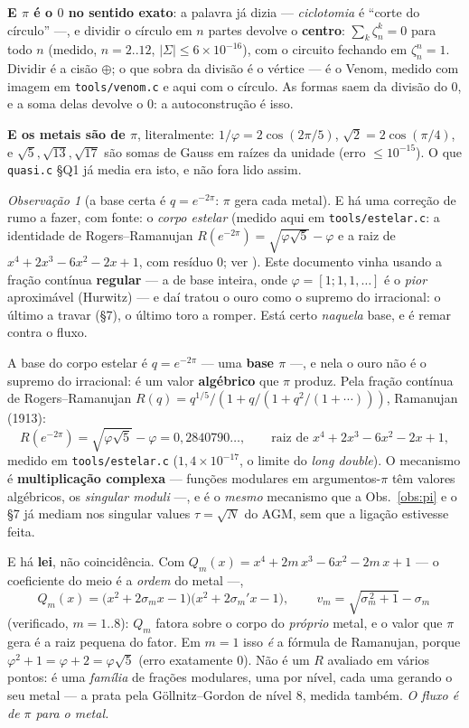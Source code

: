 \documentclass[11pt]{article}
\newcommand{\code}[1]{\texttt{\small #1}}
\theoremstyle{plain}
\theoremstyle{remark}
\newtheorem{obs}{Observação}
\begin{document}
\textbf{E $\pi$ é o $0$ no sentido exato}: a palavra já dizia --- \emph{ciclotomia} é ``corte do
círculo'' ---, e dividir o círculo em $n$ partes devolve o \textbf{centro}: $\sum_k \zeta_n^k = 0$ para
todo $n$ (medido, $n=2..12$, $|\Sigma|\le6\times10^{-16}$), com o circuito fechando em $\zeta_n^n=1$.
Dividir é a cisão $\oplus$; o que sobra da divisão é o vértice --- é o Venom, medido com imagem em
\code{tools/venom.c} e aqui com o círculo. As formas saem da divisão do $0$, e a soma delas devolve o
$0$: a autoconstrução é isso.

\textbf{E os metais são de $\pi$}, literalmente: $1/\varphi=2\cos(2\pi/5)$, $\sqrt2=2\cos(\pi/4)$, e
$\sqrt5,\sqrt{13},\sqrt{17}$ são somas de Gauss em raízes da unidade (erro $\le10^{-15}$). O que
\code{quasi.c} §Q1 já media era isto, e não fora lido assim.

\begin{obs}[a base certa é $q=e^{-2\pi}$: $\pi$ gera cada metal]\label{obs:base}
E há uma correção de rumo a fazer, com fonte: o \emph{corpo estelar}
(medido aqui em \code{tools/estelar.c}: a identidade de Rogers--Ramanujan
$R(e^{-2\pi})=\sqrt{\varphi\sqrt5}-\varphi$ e a raiz de $x^4+2x^3-6x^2-2x+1$, com resíduo $0$;
ver \cite{rogers,ramanujan}). Este documento vinha
usando a fração contínua \textbf{regular} --- a de base inteira, onde $\varphi=[1;1,1,\dots]$ é o
\emph{pior} aproximável (Hurwitz) --- e daí tratou o ouro como o supremo do irracional: o último a
travar (§7), o último toro a romper. Está certo \emph{naquela} base, e é remar contra o fluxo.

A base do corpo estelar é $q=e^{-2\pi}$ --- uma \textbf{base $\pi$} ---, e nela o ouro não é o supremo
do irracional: é um valor \textbf{algébrico} que $\pi$ produz. Pela fração contínua de
Rogers--Ramanujan $R(q)=q^{1/5}/(1+q/(1+q^2/(1+\cdots)))$, Ramanujan (1913):
\[
 R\!\left(e^{-2\pi}\right)=\sqrt{\varphi\sqrt5}-\varphi=0{,}2840790\ldots,
 \qquad\text{raiz de } x^4+2x^3-6x^2-2x+1,
\]
medido em \code{tools/estelar.c} ($1{,}4\times10^{-17}$, o limite do \emph{long double}). O mecanismo é
\textbf{multiplicação complexa} --- funções modulares em argumentos-$\pi$ têm valores algébricos, os
\emph{singular moduli} ---, e é o \emph{mesmo} mecanismo que a Obs.~\ref{obs:pi} e o §7 já mediam nos
singular values $\tau=\sqrt N$ do AGM, sem que a ligação estivesse feita.

E há \textbf{lei}, não coincidência. Com $Q_m(x)=x^4+2m\,x^3-6x^2-2m\,x+1$ --- o coeficiente do meio é
a \emph{ordem} do metal ---,
\[
 Q_m(x)=\bigl(x^2+2\sigma_m x-1\bigr)\bigl(x^2+2\sigma_m' x-1\bigr),
 \qquad \boxed{\,v_m=\sqrt{\sigma_m^{\,2}+1}-\sigma_m\,}
\]
(verificado, $m=1..8$): $Q_m$ fatora sobre o corpo do \emph{próprio} metal, e o valor que $\pi$ gera é a
raiz pequena do fator. Em $m=1$ isso \emph{é} a fórmula de Ramanujan, porque $\varphi^2+1=\varphi+2=
\varphi\sqrt5$ (erro exatamente $0$). Não é um $R$ avaliado em vários pontos: é uma \emph{família} de
frações modulares, uma por nível, cada uma gerando o seu metal --- a prata pela Göllnitz--Gordon de
nível $8$, medida também. \emph{O fluxo é de $\pi$ para o metal.}
\end{obs}
\end{document}
